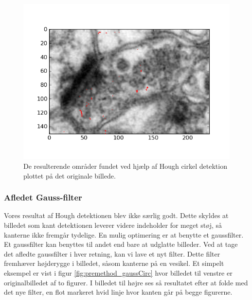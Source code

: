 \begin{figure}[H]
	\centering
	\includegraphics[scale=0.8]{files/premethod/img/houghres.png}
	\caption{De resulterende områder fundet ved hjælp af Hough cirkel detektion plottet på det originale billede.\label{fig:premethod_houghCellLinesThresholdOnOrig}}
\end{figure}


\subsubsection{Afledet Gauss-filter}
Vores resultat af Hough detektionen blev ikke særlig godt. Dette skyldes at billedet som kant detektionen leverer videre indeholder for meget støj, så kanterne ikke fremgår tydelige. En mulig optimering er at benytte et gaussfilter. Et gaussfilter kan benyttes til andet end bare at udglatte billeder. Ved at tage det afledte gaussfilter i hver retning, kan vi lave et nyt filter. Dette filter fremhæver højderygge i billedet, såsom kanterne på en vesikel. Et simpelt eksempel er vist i figur \ref{fig:premethod_gaussCirc} hvor billedet til venstre er originalbilledet af to figurer. I billedet til højre ses så resultatet efter at folde med det nye filter, en flot markeret hvid linje hvor kanten går på begge figurerne.

